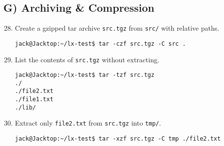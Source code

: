 \subsection*{G) Archiving \& Compression}
\begin{enumerate}
  \setcounter{enumi}{27}
  \item Create a gzipped tar archive \texttt{src.tgz} from \texttt{src/} with relative paths.
  \begin{verbatim}
jack@Jacktop:~/lx-test$ tar -czf src.tgz -C src .
    \end{verbatim}

  \item List the contents of \texttt{src.tgz} without extracting.
  \begin{verbatim}
jack@Jacktop:~/lx-test$ tar -tzf src.tgz
./
./file2.txt
./file1.txt
./lib/
    \end{verbatim}

  \item Extract only \texttt{file2.txt} from \texttt{src.tgz} into \texttt{tmp/}.
  \begin{verbatim}
jack@Jacktop:~/lx-test$ tar -xzf src.tgz -C tmp ./file2.txt
    \end{verbatim}
\end{enumerate}

